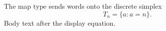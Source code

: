 \documentclass{article}
\newcommand{\type}{\mathrm{type}}
\begin{document}
The map \(\type\) sends words onto the discrete simplex
\[ T_{n} = \{a : a = n\}. \]
Body text after the display equation.
\end{document}
